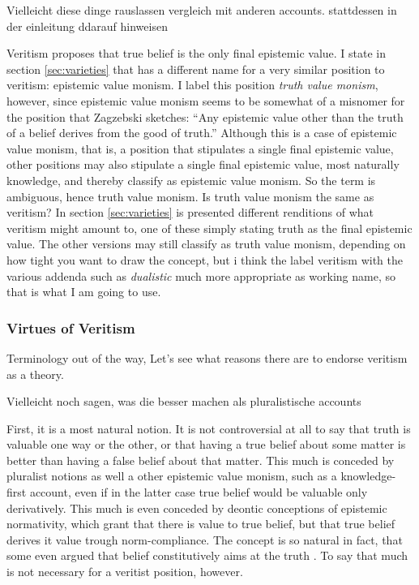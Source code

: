 \documentclass[12pt,numbers=noenddot]{scrartcl}
\begin{document}
Vielleicht diese dinge rauslassen vergleich mit anderen accounts. stattdessen in der einleitung ddarauf hinweisen

Veritism proposes that true belief is the only final epistemic value. I state in section \ref{sec:varieties} that \textcite[191]{Zagzebski2004-ZAGEVM-2} has a different name for a very similar position to veritism: epistemic value monism. I label this position \emph{truth value monism}, however, since epistemic value monism seems to be somewhat of a misnomer for the position that Zagzebski sketches: “Any epistemic value other than the truth of a belief derives from the good of truth.” Although this is a case of epistemic value monism, that is, a position that stipulates a single final epistemic value, other positions may also stipulate a single final epistemic value, most naturally knowledge, and thereby classify as epistemic value monism. So the term is ambiguous, hence truth value monism.
Is truth value monism the same as veritism? In section \ref{sec:varieties} is presented different renditions of what veritism might amount to, one of these simply stating truth as the final epistemic value. The other versions may still classify as truth value monism, depending on how tight you want to draw the concept, but i think the label veritism with the various addenda such as \emph{dualistic} much more appropriate as working name, so that is what I am going to use.

\subsubsection { Virtues of Veritism }
Terminology out of the way, Let's see what reasons there are to endorse veritism as a theory.

Vielleicht noch sagen, was die besser machen als pluralistische accounts

First, it is a most natural notion. It is not controversial at all to say that truth is valuable one way or the other, or that having a true belief about some matter is better than having a false belief about that matter. This much is conceded by pluralist notions as well a other epistemic value monism, such as a knowledge-first account, even if in the latter case true belief would be valuable only derivatively. This much is even conceded by deontic conceptions of epistemic normativity, which grant that there is value to true belief, but that true belief derives it value trough norm-compliance. The concept is so natural in fact, that some even argued that belief constitutively aims at the truth \autocite{Shah2003-SHAHTG,Velleman2000-VELOTA}. To say that much is not necessary for a veritist position, however.
\end{document}
